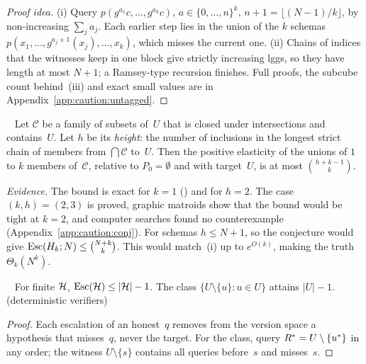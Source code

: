 \begin{proof}[Proof idea]
(i) Query $p(g^{a_1}c,\dots,g^{a_k}c)$, $a\in\{0,\dots,n\}^k$, $n+1=\lfloor(N-1)/k\rfloor$, by non-increasing $\sum_ja_j$. Each earlier step lies in the union of the $k$ schemas $p(x_1,\dots,g^{a_j+1}(x_j),\dots,x_k)$, which misses the current one. (ii) Chains of indices that the witnesses keep in one block give strictly increasing lggs, so they have length at most $N+1$; a Ramsey-type recursion finishes. Full proofs, the subcube count behind~(iii) and exact small values are in Appendix~\ref{app:caution:untagged}.
\end{proof}

\begin{conjecture}\ \label{conj:caution:binomial}
Let $\mathcal C$ be a family of subsets of~$U$ that is closed under intersections and contains~$U$. Let $h$ be its \emph{height}: the number of inclusions in the longest strict chain of members from $\bigcap\mathcal C$ to~$U$. Then the positive elasticity of the unions of $1$ to $k$ members of~$\mathcal C$, relative to $P_0=\emptyset$ and with target~$U$, is at most $\binom{h+k-1}{k}$.
\end{conjecture}

\noindent\emph{Evidence.} The bound is exact for $k=1$ () and for $h=2$. The case $(k,h)=(2,3)$ is proved, graphic matroids show that the bound would be tight at $k=2$, and computer searches found no counterexample (Appendix~\ref{app:caution:conj}). For schemas $h\le N+1$, so the conjecture would give $\mathrm{Esc}(H_k;N)\le\binom{N+k}{k}$. This would match~(i) up to $e^{O(k)}$, making the truth $\Theta_k(N^k)$.

\begin{theorem}\ \label{thm:caution:unstructured}
For finite $\mathcal{H}$, $\mathrm{Esc}(\mathcal{H})\le|\mathcal{H}|-1$. The class $\{U\setminus\{u\}:u\in U\}$ attains $|U|-1$.
\hfill{}\  (deterministic verifiers)
\end{theorem}

\begin{proof}
Each escalation of an honest~$q$ removes from the version space a hypothesis that misses~$q$, never the target. For the class, query $R^{*}=U\setminus\{u^*\}$ in any order; the witness $U\setminus\{s\}$ contains all queries before~$s$ and misses~$s$.
\end{proof}

